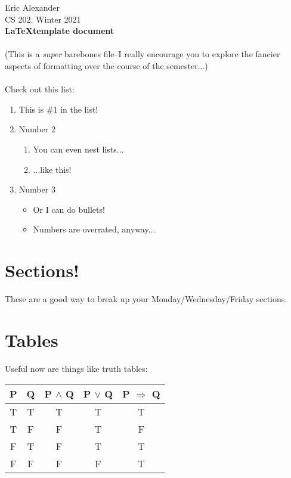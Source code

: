 \documentclass{article}
\begin{document}
\noindent
Eric Alexander \\
CS 202, Winter 2021 \\
\textbf{\LaTeX template document}\\
\\
(This is a \emph{super} barebones file--I really encourage you to explore the fancier aspects of formatting over the course of the semester...)
\\
\\
\noindent
Check out this list:
\begin{enumerate}
	\item This is \#1 in the list!
	\item Number 2
		\begin{enumerate}
			\item You can even nest lists...
			\item ...like this!
		\end{enumerate}
	\item Number 3
	\begin{itemize}
		\item Or I can do bullets!
		\item Numbers are overrated, anyway...
	\end{itemize}

\end{enumerate}

\section{Sections!}

These are a good way to break up your Monday/Wednesday/Friday sections.

\section{Tables}
\noindent
Useful now are things like truth tables: \\

\begin{tabular}{c | c || c | c | c}

	P	& Q	& P $\land$ Q & P $\lor$ Q & P $\Rightarrow$ Q \\
	\hline
	T 	& T 	& T & T & T \\
	T 	& F 	& F & T & F \\
	F 	& T 	& F & T & T \\
	F 	& F 	& F & F & T \\

\end{tabular}
\end{document}
